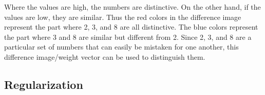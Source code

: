 \documentclass[11pt,twoside]{article}
\begin{document}
\begin{enumerate}[label=(\alph*)]
\begin{itemize}
  Where the values are high, the numbers are distinctive. On the other hand, if the values are low, they are similar. Thus the red colors in the difference image represent the part where 2, 3, and 8 are all distinctive. The blue colors represent the part where 3 and 8 are similar but different from 2. Since 2, 3, and 8 are a particular set of numbers that can easily be mistaken for one another, this difference image/weight vector can be used to distinguish them.
  
\end{itemize}

\end{enumerate}

\subsection{Regularization}
\end{document}
